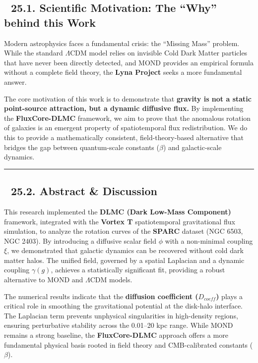 \documentclass[
]{article}
\begin{document}
\subsection{📑 25.1. Scientific Motivation: The ``Why'' behind this
Work}\label{scientific-motivation-the-why-behind-this-work}

Modern astrophysics faces a fundamental crisis: the ``Missing Mass''
problem. While the standard \(\Lambda\)CDM model relies on invisible
Cold Dark Matter particles that have never been directly detected, and
MOND provides an empirical formula without a complete field theory, the
\textbf{Lyna Project} seeks a more fundamental answer.

The core motivation of this work is to demonstrate that \textbf{gravity
is not a static point-source attraction, but a dynamic diffusive flux.}
By implementing the \textbf{FluxCore-DLMC} framework, we aim to prove
that the anomalous rotation of galaxies is an emergent property of
spatiotemporal flux redistribution. We do this to provide a
mathematically consistent, field-theory-based alternative that bridges
the gap between quantum-scale constants (\(\beta\)) and galactic-scale
dynamics.

\begin{center}\rule{0.5\linewidth}{0.5pt}\end{center}

\subsection{📑 25.2. Abstract \& Discussion}\label{abstract-discussion}

This research implemented the \textbf{DLMC (Dark Low-Mass Component)}
framework, integrated with the \textbf{Vortex T} spatiotemporal
gravitational flux simulation, to analyze the rotation curves of the
\textbf{SPARC} dataset (NGC 6503, NGC 2403). By introducing a diffusive
scalar field \(\phi\) with a non-minimal coupling \(\xi\), we
demonstrated that galactic dynamics can be recovered without cold dark
matter halos. The unified field, governed by a spatial Laplacian and a
dynamic coupling \(\gamma(g)\), achieves a statistically significant
fit, providing a robust alternative to MOND and \(\Lambda\)CDM models.

The numerical results indicate that the \textbf{diffusion coefficient
(\(D_{coeff}\))} plays a critical role in smoothing the gravitational
potential at the disk-halo interface. The Laplacian term prevents
unphysical singularities in high-density regions, ensuring perturbative
stability across the 0.01--20 kpc range. While MOND remains a strong
baseline, the \textbf{FluxCore-DLMC} approach offers a more fundamental
physical basis rooted in field theory and CMB-calibrated constants
(\(\beta\)).
\end{document}
